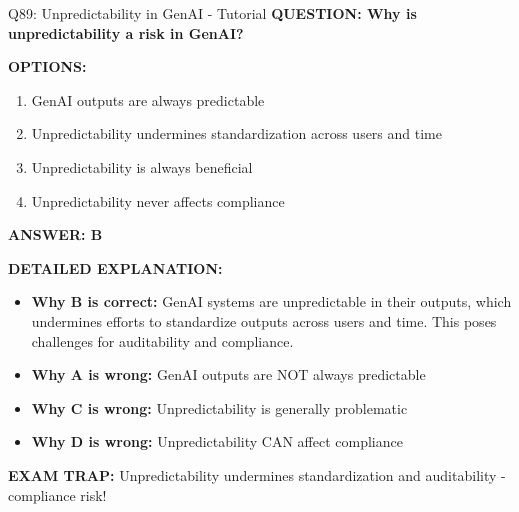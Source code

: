 \documentclass[8pt]{beamer}
\begin{document}
	\begin{frame}{Q89: Unpredictability in GenAI - Tutorial}
		\fontsize{6.5}{7.5}\selectfont
		\textbf{QUESTION: Why is unpredictability a risk in GenAI?}
		
		\vspace{0.1cm}
		\textbf{OPTIONS:}
		\begin{enumerate}
			\item GenAI outputs are always predictable
			\item Unpredictability undermines standardization across users and time
			\item Unpredictability is always beneficial
			\item Unpredictability never affects compliance
		\end{enumerate}
		
		\vspace{0.1cm}
		\textcolor{myblue}{\textbf{ANSWER: B}}
		
		\vspace{0.1cm}
		\textbf{DETAILED EXPLANATION:}
		\begin{itemize}
			\item \textbf{Why B is correct:} GenAI systems are unpredictable in their outputs, which undermines efforts to standardize outputs across users and time. This poses challenges for auditability and compliance.
			\item \textbf{Why A is wrong:} GenAI outputs are NOT always predictable
			\item \textbf{Why C is wrong:} Unpredictability is generally problematic
			\item \textbf{Why D is wrong:} Unpredictability CAN affect compliance
		\end{itemize}
		
		\textcolor{myred}{\textbf{EXAM TRAP:}} Unpredictability undermines \textcolor{myblue}{standardization and auditability} - compliance risk!
	\end{frame}
	
\end{document}

